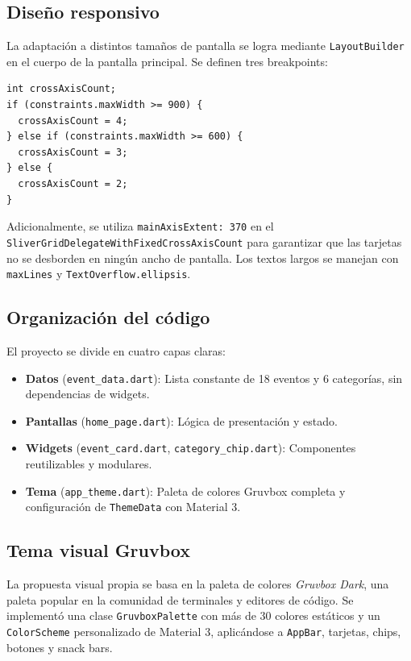 \documentclass[12pt, a4paper]{article}
\begin{document}
\subsection{Diseño responsivo}

La adaptación a distintos tamaños de pantalla se logra mediante \texttt{LayoutBuilder} en el cuerpo de la pantalla principal. Se definen tres breakpoints:

\begin{lstlisting}[basicstyle=\ttfamily\small]
int crossAxisCount;
if (constraints.maxWidth >= 900) {
  crossAxisCount = 4;
} else if (constraints.maxWidth >= 600) {
  crossAxisCount = 3;
} else {
  crossAxisCount = 2;
}
\end{lstlisting}

Adicionalmente, se utiliza \texttt{mainAxisExtent: 370} en el \texttt{SliverGridDelegateWithFixedCrossAxisCount} para garantizar que las tarjetas no se desborden en ningún ancho de pantalla. Los textos largos se manejan con \texttt{maxLines} y \texttt{TextOverflow.ellipsis}.

\subsection{Organización del código}

El proyecto se divide en cuatro capas claras:

\begin{itemize}[noitemsep]
    \item \textbf{Datos} (\texttt{event\_data.dart}): Lista constante de 18 eventos y 6 categorías, sin dependencias de widgets.
    \item \textbf{Pantallas} (\texttt{home\_page.dart}): Lógica de presentación y estado.
    \item \textbf{Widgets} (\texttt{event\_card.dart}, \texttt{category\_chip.dart}): Componentes reutilizables y modulares.
    \item \textbf{Tema} (\texttt{app\_theme.dart}): Paleta de colores Gruvbox completa y configuración de \texttt{ThemeData} con Material 3.
\end{itemize}

\subsection{Tema visual Gruvbox}

La propuesta visual propia se basa en la paleta de colores \textit{Gruvbox Dark}, una paleta popular en la comunidad de terminales y editores de código. Se implementó una clase \texttt{GruvboxPalette} con más de 30 colores estáticos y un \texttt{ColorScheme} personalizado de Material 3, aplicándose a \texttt{AppBar}, tarjetas, chips, botones y snack bars.
\end{document}
